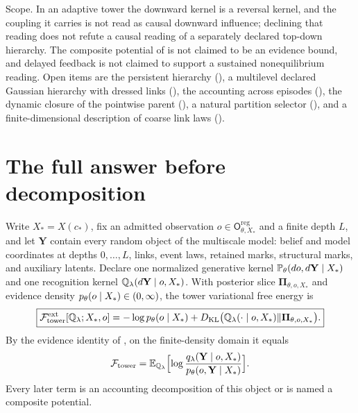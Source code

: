 Scope. In an adaptive tower the downward kernel is a reversal kernel, and the coupling
it carries is not read as causal downward influence; declining that reading does not
refute a causal reading of a separately declared top-down hierarchy. The composite
potential of  is not claimed to be an
evidence bound, and delayed feedback is not claimed to support a sustained
nonequilibrium reading.  Open items are the persistent hierarchy
(), a multilevel declared Gaussian hierarchy with dressed links
(), the accounting across episodes
(), the dynamic closure of the pointwise
parent (), a natural partition selector
(), and a finite-dimensional description of coarse link laws
().

\section{The full answer before decomposition}
\label{sec:full-graph-vfe-global}

Write $X_*=X(c_*)$, fix an admitted observation $o\in\mathsf
O^{\mathrm{reg}}_{\theta,X_*}$ and a finite depth $L$, and let $\mathbf Y$ contain
every random object of the multiscale model: belief and model coordinates at depths
$0,\ldots,L$, links, event laws, retained marks, structural marks, and auxiliary
latents. Declare one normalized generative kernel $\mathbb
P_\theta(do,d\mathbf Y\mid X_*)$ and one recognition kernel $\mathbb
Q_\lambda(d\mathbf Y\mid o,X_*)$. With posterior slice
$\boldsymbol\Pi_{\theta,o,X_*}$ and evidence density $p_\theta(o\mid
X_*)\in(0,\infty)$, the tower variational free energy is
\begin{equation}
\boxed{
\mathcal F^{\mathrm{ext}}_{\mathrm{tower}}[\mathbb Q_\lambda;X_*,o]
=-\log p_\theta(o\mid X_*)
+D_{\mathrm{KL}}\bigl(\mathbb Q_\lambda(\cdot\mid o,X_*)\Vert\boldsymbol\Pi_{\theta,o,X_*}\bigr).}
\label{eq:full-graph-vfe-global}
\end{equation}
By the evidence identity of , on the finite-density domain it equals
\begin{equation}
\mathcal F_{\mathrm{tower}}
=\mathbb E_{\mathbb Q_\lambda}\Bigl[\log\frac{q_\lambda(\mathbf Y\mid o,X_*)}{p_\theta(o,\mathbf Y\mid X_*)}\Bigr].
\label{eq:full-graph-vfe-density}
\end{equation}
Every later term is an accounting decomposition of this object or is named a
composite potential.

